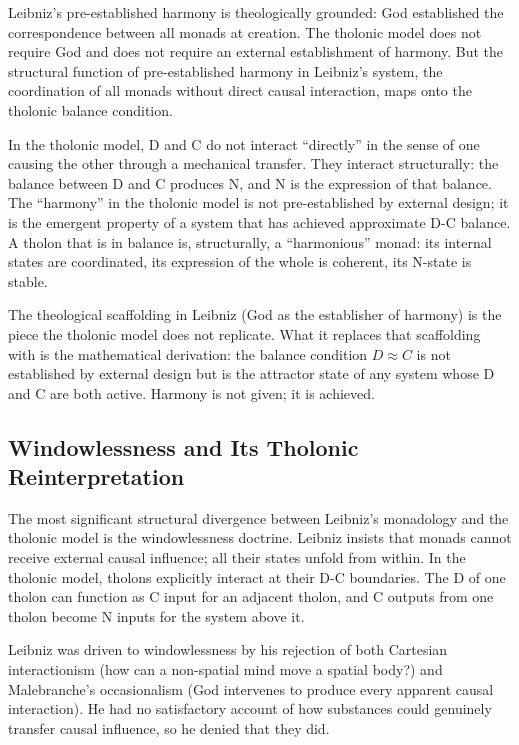 \documentclass[12pt]{article}
\begin{document}
Leibniz's pre-established harmony is theologically grounded: God
established the correspondence between all monads at creation. The
tholonic model does not require God and does not require an external
establishment of harmony. But the structural function of pre-established
harmony in Leibniz's system, the coordination of all monads without
direct causal interaction, maps onto the tholonic balance condition.

In the tholonic model, D and C do not interact ``directly'' in the sense
of one causing the other through a mechanical transfer. They interact
structurally: the balance between D and C produces N, and N is the
expression of that balance. The ``harmony'' in the tholonic model is not
pre-established by external design; it is the emergent property of a
system that has achieved approximate D-C balance. A tholon that is in
balance is, structurally, a ``harmonious'' monad: its internal states
are coordinated, its expression of the whole is coherent, its N-state is
stable.

The theological scaffolding in Leibniz (God as the establisher of
harmony) is the piece the tholonic model does not replicate. What it
replaces that scaffolding with is the mathematical derivation: the
balance condition \(D \approx C\) is not established by external design
but is the attractor state of any system whose D and C are both active.
Harmony is not given; it is achieved.

\subsection{Windowlessness and Its Tholonic Reinterpretation}\label{windowlessness-and-its-tholonic-reinterpretation}

The most significant structural divergence between Leibniz's monadology
and the tholonic model is the windowlessness doctrine. Leibniz insists
that monads cannot receive external causal influence; all their states
unfold from within. In the tholonic model, tholons explicitly interact
at their D-C boundaries. The D of one tholon can function as C input for
an adjacent tholon, and C outputs from one tholon become N inputs for
the system above it.

Leibniz was driven to windowlessness by his rejection of both Cartesian
interactionism (how can a non-spatial mind move a spatial body?) and
Malebranche's occasionalism (God intervenes to produce every apparent
causal interaction). He had no satisfactory account of how substances
could genuinely transfer causal influence, so he denied that they did.
\end{document}
